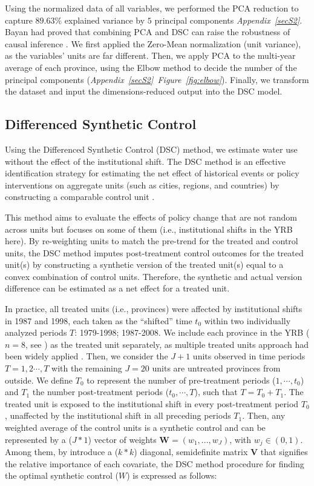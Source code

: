\documentclass[default, sn-standardnature]{sn-jnl}
\begin{document}
Using the normalized data of all variables, we performed the PCA reduction to capture $89.63\%$ explained variance by $5$ principal components \textit{Appendix~\ref{secS2}}. Bayan had proved that combining PCA and DSC can raise the robustness of causal inference \cite{bayani2021}. We first applied the Zero-Mean normalization (unit variance), as the variables' units are far different. Then, we apply PCA to the multi-year average of each province, using the Elbow method to decide the number of the principal components (\textit{Appendix~\ref{secS2}~Figure~\ref{fig:elbow}}). Finally, we transform the dataset and input the dimensions-reduced output into the DSC model.


\subsection{Differenced Synthetic Control}\label{sec:DSC}
Using the Differenced Synthetic Control (DSC) method, we estimate water use without the effect of the institutional shift.
The DSC method is an effective identification strategy for estimating the net effect of historical events or policy interventions on aggregate units (such as cities, regions, and countries) by constructing a comparable control unit \cite{abadie2010, abadie2015, hill2021}.

This method aims to evaluate the effects of policy change that are not random across units but focuses on some of them (i.e., institutional shifts in the YRB here).
By re-weighting units to match the pre-trend for the treated and control units, the DSC method imputes post-treatment control outcomes for the treated unit(s) by constructing a synthetic version of the treated unit(s) equal to a convex combination of control units.
Therefore, the synthetic and actual version difference can be estimated as a net effect for a treated unit.

In practice, all treated units (i.e., provinces) were affected by institutional shifts in 1987 and 1998, each taken as the ``shifted'' time $t_0$ within two individually analyzed periods $T$: 1979-1998; 1987-2008.
We include each province in the YRB ($n=8$, see \textit{}) as the treated unit separately, as multiple treated units approach had been widely applied \cite{abadie2021}.
Then, we consider the $J+1$ units observed in time periods $T = {1,2 \cdots , T}$ with the remaining $J=20$ units are untreated provinces from outside.
We define $T_0$ to represent the number of pre-treatment periods ($1,\cdots,t_0$) and $T_1$ the number post-treatment periods ($t_0,\cdots,T$), such that $T = T_0+ T_1$.
The treated unit is exposed to the institutional shift in every post-treatment period $T_0$, unaffected by the institutional shift in all preceding periods $T_1$.
Then, any weighted average of the control units is a synthetic control and can be represented by a ($J * 1$) vector of weights $\mathbf{W} = (w_{1},...,w_{J})$, with $w_j \in (0, 1)$.
Among them, by introduce a ($k * k$) diagonal, semidefinite matrix $\mathbf{V}$ that signifies the relative importance of each covariate, the DSC method procedure for finding the optimal synthetic control ($W$) is expressed as follows:
\end{document}
